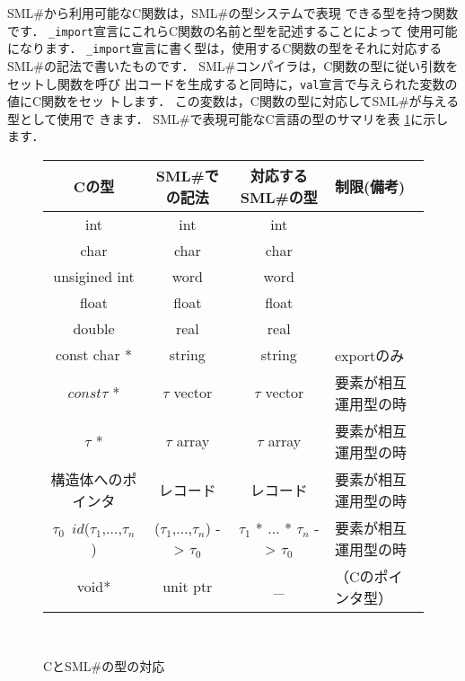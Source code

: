 \documentclass{jbook}
\newcommand{\smlsharp}{SML\#}
\begin{document}
\ifx\jp%
	\smlsharp{}から利用可能なC関数は，\smlsharp{}の型システムで表現
できる型を持つ関数です．
	{\tt \_import}宣言にこれらC関数の名前と型を記述することによって
使用可能になります．
	{\tt \_import}宣言に書く型は，使用するC関数の型をそれに対応する
\smlsharp{}の記法で書いたものです．
	\smlsharp{}コンパイラは，C関数の型に従い引数をセットし関数を呼び
出コードを生成すると同時に，{\tt val}宣言で与えられた変数の値にC関数をセッ
トします．
	この変数は，C関数の型に対応して\smlsharp{}が与える型として使用で
きます．
	\smlsharp{}で表現可能なC言語の型のサマリを表
\ref{fig:interoperableType}に示します．
\begin{figure}
\begin{center}
\begin{tabular}{|c|c|c|l|}
\hline
Cの型 & \smlsharp{}での記法 & 対応する\smlsharp{}の型 & 制限(備考)
\\ \hline
int & int & int & 
\\
char & char &char &
\\
unsigined int & word &word &
\\
float & float &float &
\\
double & real &real &
\\
const char * & string &string & exportのみ
\\
$const \tau$ * & $\tau$ vector & $\tau$ vector & 要素が相互運用型の時
\\
$\tau$ * & $\tau$ array & $\tau$ array & 要素が相互運用型の時
\\
構造体へのポインタ & レコード & レコード & 要素が相互運用型の時
\\
$\tau_0$\ $id$($\tau_1$,$\ldots$,$\tau_n$) & 
($\tau_1$,$\ldots$,$\tau_n$) -> $\tau_0$ & 
$\tau_1$ * $\ldots$ * $\tau_n$ -> $\tau_0$ & 
要素が相互運用型の時
\\
void* & unit ptr & \_ & （Cのポインタ型）
\\\hline
\end{tabular}\\
\caption{Cと\smlsharp{}の型の対応}
\label{fig:interoperableType}
\end{center}
\end{figure}
\end{document}
